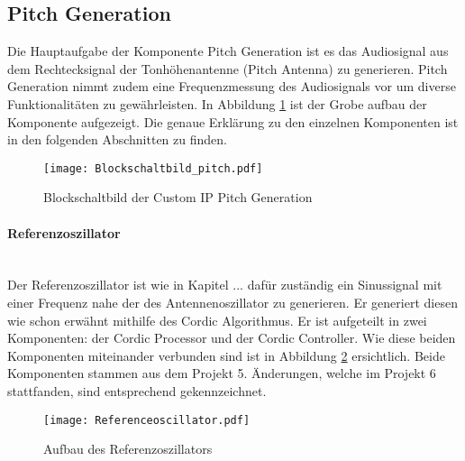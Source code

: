 \subsection{Pitch Generation}\label{subsec:Pitch_Generation}

Die Hauptaufgabe der Komponente Pitch Generation ist es das Audiosignal aus dem Rechtecksignal der Tonhöhenantenne (Pitch Antenna) zu generieren. Pitch Generation nimmt zudem eine Frequenzmessung des Audiosignals vor um diverse Funktionalitäten zu gewährleisten. In Abbildung \ref{img:Blockschaltbild_pitch} ist der Grobe aufbau der Komponente aufgezeigt. Die genaue Erklärung zu den einzelnen Komponenten ist in den folgenden Abschnitten zu finden.


\begin{figure}[h!]
	\centering
	\texttt{[image: Blockschaltbild\_pitch.pdf]}
	\caption{Blockschaltbild der Custom IP Pitch Generation} 
	\label{img:Blockschaltbild_pitch}
\end{figure}  



\paragraph{Referenzoszillator}\mbox{}\\

Der Referenzoszillator ist wie in Kapitel ...  dafür zuständig ein Sinussignal mit einer Frequenz nahe der des Antennenoszillator zu generieren. Er generiert diesen wie schon erwähnt mithilfe des Cordic Algorithmus. Er ist aufgeteilt in zwei Komponenten: der Cordic Processor und der Cordic Controller. Wie diese beiden Komponenten miteinander verbunden sind ist in Abbildung \ref{img:Referenceoscillator} ersichtlich. Beide Komponenten stammen aus dem Projekt 5. Änderungen, welche im Projekt 6 stattfanden, sind entsprechend gekennzeichnet. \\

\begin{figure}[h!]
	\centering
	\texttt{[image: Referenceoscillator.pdf]}
	\caption{Aufbau des Referenzoszillators} 
	\label{img:Referenceoscillator}
\end{figure}  

